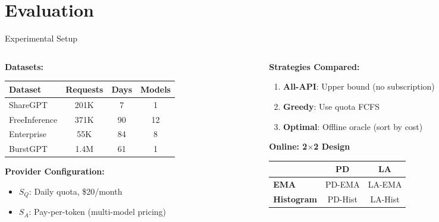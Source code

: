 \documentclass[aspectratio=169,10pt]{beamer}
\begin{document}
\section{Evaluation}

\begin{frame}{Experimental Setup}
\begin{columns}[T]
\begin{column}{0.5\textwidth}
\textbf{Datasets:}
\begin{table}[h]
\footnotesize
\begin{tabular}{lccc}
\toprule
Dataset & Requests & Days & Models \\
\midrule
ShareGPT & 201K & 7 & 1 \\
FreeInference & 371K & 90 & 12 \\
Enterprise & 55K & 84 & 8 \\
BurstGPT & 1.4M & 61 & 1 \\
\bottomrule
\end{tabular}
\end{table}

\vspace{0.2cm}
\textbf{Provider Configuration:}
\begin{itemize}
    \item $S_Q$: Daily quota, \$20/month
    \item $S_A$: Pay-per-token (multi-model pricing)
\end{itemize}
\end{column}

\begin{column}{0.45\textwidth}
\textbf{Strategies Compared:}
\begin{enumerate}\setlength{\itemsep}{1pt}
    \item \textbf{All-API}: Upper bound (no subscription)
    \item \textbf{Greedy}: Use quota FCFS
    \item \textbf{Optimal}: Offline oracle (sort by cost)
\end{enumerate}

\vspace{0.1cm}
\textbf{Online: 2$\times$2 Design}
\footnotesize
\begin{tabular}{@{}l|cc@{}}
 & \textbf{PD} & \textbf{LA} \\
\midrule
\textbf{EMA} & PD-EMA & LA-EMA \\
\textbf{Histogram} & PD-Hist & LA-Hist \\
\end{tabular}


\end{column}
\end{columns}
\end{frame}
\end{document}
